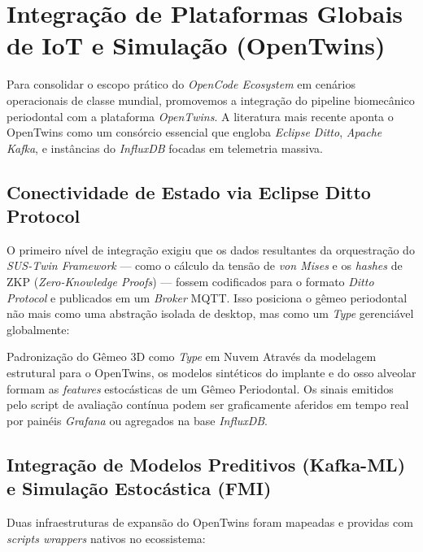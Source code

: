 \section{Integração de Plataformas Globais de IoT e Simulação (OpenTwins)}
\label{sec:opentwins_integration}

Para consolidar o escopo prático do \textit{OpenCode Ecosystem} em cenários operacionais de classe mundial, promovemos a integração do pipeline biomecânico periodontal com a plataforma \textit{OpenTwins}\cite{OpenTwins_Quickstart}. A literatura mais recente aponta o OpenTwins como um consórcio essencial que engloba \textit{Eclipse Ditto}, \textit{Apache Kafka}, e instâncias do \textit{InfluxDB} focadas em telemetria massiva.

\subsection{Conectividade de Estado via Eclipse Ditto Protocol}
O primeiro nível de integração exigiu que os dados resultantes da orquestração do \textit{SUS-Twin Framework} — como o cálculo da tensão de \textit{von Mises} e os \textit{hashes} de ZKP (\textit{Zero-Knowledge Proofs}) — fossem codificados para o formato \textit{Ditto Protocol} e publicados em um \textit{Broker} MQTT. Isso posiciona o gêmeo periodontal não mais como uma abstração isolada de desktop, mas como um \textit{Type} gerenciável globalmente:

\begin{destaque}{Padronização do Gêmeo 3D como \textit{Type} em Nuvem}
Através da modelagem estrutural para o OpenTwins, os modelos sintéticos do implante e do osso alveolar formam as \textit{features} estocásticas de um Gêmeo Periodontal. Os sinais emitidos pelo script de avaliação contínua podem ser graficamente aferidos em tempo real por painéis \textit{Grafana} ou agregados na base \textit{InfluxDB}.
\end{destaque}

\subsection{Integração de Modelos Preditivos (Kafka-ML) e Simulação Estocástica (FMI)}
Duas infraestruturas de expansão do OpenTwins foram mapeadas e providas com \textit{scripts wrappers} nativos no ecossistema:

